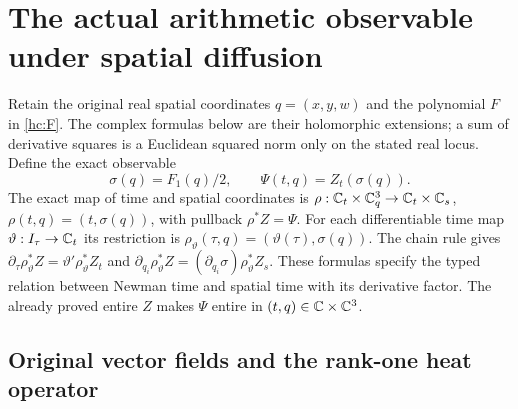 \section{The actual arithmetic observable under spatial diffusion}
\label{sec:eo}

Retain the original real spatial coordinates $q=(x,y,w)$ and the
polynomial $F$ in \eqref{hc:F}. The complex formulas below are their
holomorphic extensions; a sum of derivative squares is a Euclidean
squared norm only on the stated real locus. Define the exact observable
\[
\sigma(q)=F_1(q)/2,\qquad \Psi(t,q)=Z_t(\sigma(q)).
\]
The exact map of time and spatial coordinates is
$\rho:\mathbb C_t\times\mathbb C_q^3\to\mathbb C_t\times\mathbb C_s$,
$\rho(t,q)=(t,\sigma(q))$, with pullback $\rho^*Z=\Psi$.
For each differentiable time map $\vartheta:I_\tau\to\mathbb C_t$ its
restriction is $\rho_\vartheta(\tau,q)=(\vartheta(\tau),\sigma(q))$.
The chain rule gives
$\partial_\tau\rho_\vartheta^*Z=\vartheta'\rho_\vartheta^*Z_t$
and $\partial_{q_i}\rho_\vartheta^*Z=(\partial_{q_i}\sigma)
\rho_\vartheta^*Z_s$. These formulas specify the typed relation
between Newman time and spatial time with its derivative factor.
The already proved entire $Z$ makes $\Psi$ entire in
$(t,q)\in\mathbb C\times\mathbb C^3$.

\subsection{Original vector fields and the rank-one heat operator}

